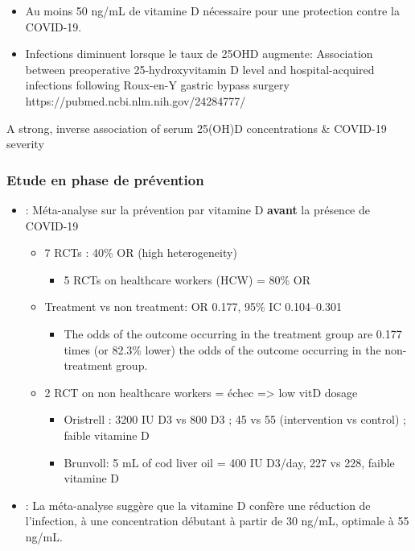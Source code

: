 \documentclass[
  a4paper,
  DIV=11,
  numbers=noendperiod,
  listof=totoc]{scrreprt}
\providecommand{\tightlist}{%
  \setlength{\itemsep}{0pt}\setlength{\parskip}{0pt}}\usepackage{longtable,booktabs,array}
\begin{document}
\begin{itemize}
\item
  Au moins 50 ng/mL de vitamine D nécessaire pour une protection contre
  la COVID-19. \textcite{Wimalawansa.2022}
\item
  Infections diminuent lorsque le taux de 25OHD augmente: Association
  between preoperative 25-hydroxyvitamin D level and hospital-acquired
  infections following Roux-en-Y gastric bypass surgery
  https://pubmed.ncbi.nlm.nih.gov/24284777/
\end{itemize}

A strong, inverse association of serum 25(OH)D concentrations \&
COVID-19 severity

\subsubsection{Etude en phase de
prévention}\label{etude-en-phase-de-pruxe9vention}

\begin{itemize}
\tightlist
\item
  \textcite{Sartini.2024}: Méta-analyse sur la prévention par vitamine D
  \textbf{avant} la présence de COVID-19

  \begin{itemize}
  \tightlist
  \item
    7 RCTs : 40\% OR (high heterogeneity)

    \begin{itemize}
    \tightlist
    \item
      5 RCTs on healthcare workers (HCW) = 80\% OR
    \end{itemize}
  \item
    Treatment vs non treatment: OR 0.177, 95\% IC 0.104--0.301

    \begin{itemize}
    \tightlist
    \item
      The odds of the outcome occurring in the treatment group are 0.177
      times (or 82.3\% lower) the odds of the outcome occurring in the
      non-treatment group.
    \end{itemize}
  \item
    2 RCT on non healthcare workers = échec =\textgreater{} low vitD
    dosage

    \begin{itemize}
    \tightlist
    \item
      Oristrell : 3200 IU D3 vs 800 D3 ; 45 vs 55 (intervention vs
      control) ; faible vitamine D
    \item
      Brunvoll: 5 mL of cod liver oil = 400 IU D3/day, 227 vs 228,
      faible vitamine D
    \end{itemize}
  \end{itemize}
\item
  \textcite{Borsche.2021}: La méta-analyse suggère que la vitamine D
  confère une réduction de l'infection, à une concentration débutant à
  partir de 30 ng/mL, optimale à 55 ng/mL.
\end{itemize}
\end{document}
